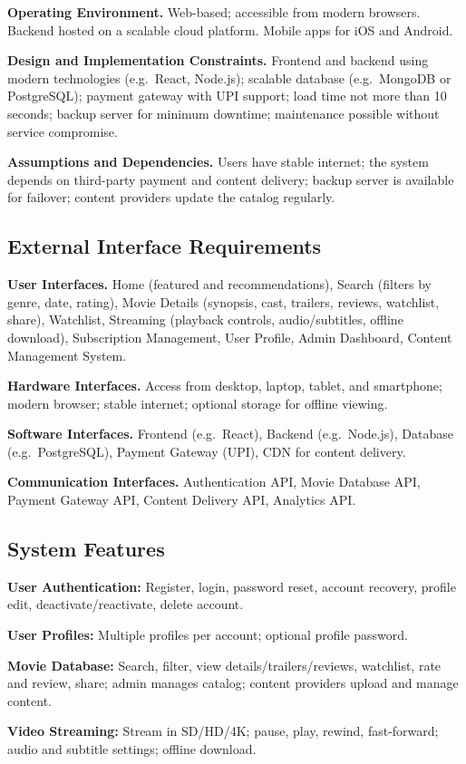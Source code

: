 \documentclass[12pt,a4paper]{article}
\newcommand{\sdlcsubsection}[1]{%
  \needspace{7\baselineskip}%
  \subsection*{\fontsize{14pt}{1.2}\selectfont #1}%
  \nopagebreak
}
\begin{document}
\textbf{Operating Environment.} Web-based; accessible from modern browsers. Backend hosted on a scalable cloud platform. Mobile apps for iOS and Android.

\textbf{Design and Implementation Constraints.} Frontend and backend using modern technologies (e.g.\ React, Node.js); scalable database (e.g.\ MongoDB or PostgreSQL); payment gateway with UPI support; load time not more than 10 seconds; backup server for minimum downtime; maintenance possible without service compromise.

\textbf{Assumptions and Dependencies.} Users have stable internet; the system depends on third-party payment and content delivery; backup server is available for failover; content providers update the catalog regularly.

\sdlcsubsection{External Interface Requirements}

\textbf{User Interfaces.} Home (featured and recommendations), Search (filters by genre, date, rating), Movie Details (synopsis, cast, trailers, reviews, watchlist, share), Watchlist, Streaming (playback controls, audio/subtitles, offline download), Subscription Management, User Profile, Admin Dashboard, Content Management System.

\textbf{Hardware Interfaces.} Access from desktop, laptop, tablet, and smartphone; modern browser; stable internet; optional storage for offline viewing.

\textbf{Software Interfaces.} Frontend (e.g.\ React), Backend (e.g.\ Node.js), Database (e.g.\ PostgreSQL), Payment Gateway (UPI), CDN for content delivery.

\textbf{Communication Interfaces.} Authentication API, Movie Database API, Payment Gateway API, Content Delivery API, Analytics API.

\sdlcsubsection{System Features}

\textbf{User Authentication:} Register, login, password reset, account recovery, profile edit, deactivate/reactivate, delete account.

\textbf{User Profiles:} Multiple profiles per account; optional profile password.

\textbf{Movie Database:} Search, filter, view details/trailers/reviews, watchlist, rate and review, share; admin manages catalog; content providers upload and manage content.

\textbf{Video Streaming:} Stream in SD/HD/4K; pause, play, rewind, fast-forward; audio and subtitle settings; offline download.
\end{document}
